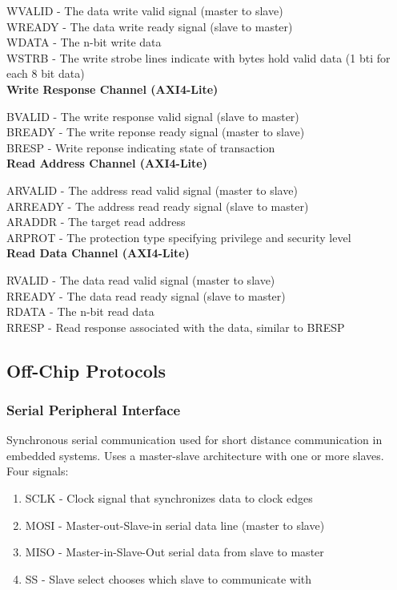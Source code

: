 \documentclass[11pt]{article}
\begin{document}
{    WVALID - The data write valid signal (master to slave)\\
    WREADY - The data write ready signal (slave to master)\\
    WDATA - The n-bit write data \\
    WSTRB - The write strobe lines indicate with bytes hold valid data (1 bti for each 8 bit data) \\

    \textbf{Write Response Channel (AXI4-Lite)}

    BVALID - The write response valid signal (slave to master) \\
    BREADY - The write reponse ready signal (master to slave) \\
    BRESP - Write reponse indicating state of transaction \\

    \textbf{Read Address Channel (AXI4-Lite)}

    ARVALID - The address read valid signal (master to slave) \\
    ARREADY - The address read ready signal (slave to master)\\
    ARADDR - The target read address \\
    ARPROT - The protection type specifying privilege and security level \\

    \textbf{Read Data Channel (AXI4-Lite)}

    RVALID - The data read valid signal (master to slave)\\
    RREADY - The data read ready signal (slave to master)\\
    RDATA - The n-bit read data \\
    RRESP - Read response associated with the data, similar to BRESP \\

    \subsection{Off-Chip Protocols}
    \subsubsection{Serial Peripheral Interface}
    Synchronous serial communication used for short distance communication in embedded systems. Uses a master-slave architecture with one or more slaves. \\
    
    Four signals:
    \begin{enumerate}
        \item SCLK - Clock signal that synchronizes data to clock edges
        \item MOSI - Master-out-Slave-in serial data line (master to slave)
        \item MISO - Master-in-Slave-Out serial data from slave to master
        \item SS - Slave select chooses which slave to communicate with
    \end{enumerate}

}
\end{document}
